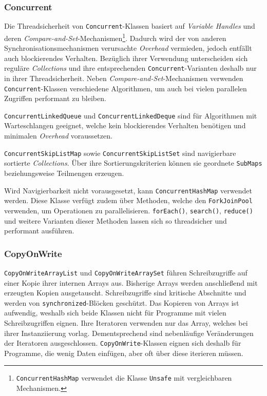 \documentclass[a4paper, 11pt]{article}
\begin{document}
\subsubsection{Concurrent}
\label{subsubsec:collections:concepts:concurrent}

Die Threadsicherheit von \verb|Concurrent|-Klassen basiert auf \textit{Variable Handles} und deren \textit{Compare-and-Set}-Mechanismen\footnote{\verb|ConcurrentHashMap| verwendet die Klasse \verb|Unsafe| mit vergleichbaren Mechanismen.}.
Dadurch wird der von anderen Synchronisationsmechanismen verursachte \textit{Overhead} vermieden, jedoch entfällt auch blockierendes Verhalten.
Bezüglich ihrer Verwendung unterscheiden sich reguläre \textit{Collections} und ihre entsprechenden \verb|Concurrent|-Varianten deshalb nur in ihrer Threadsicherheit.
Neben \textit{Compare-and-Set}-Mechanismen verwenden \verb|Concurrent|-Klassen verschiedene Algorithmen, um auch bei vielen parallelen Zugriffen performant zu bleiben.

\verb|ConcurrentLinkedQueue| und \verb|ConcurrentLinkedDeque| sind für Algorithmen mit Warteschlangen geeignet, welche kein blockierendes Verhalten benötigen und minimalen \textit{Overhead} voraussetzen.

\verb|ConcurrentSkipListMap| sowie \verb|ConcurrentSkipListSet| sind navigierbare sortierte \textit{Collections}.
Über ihre Sortierungskriterien können sie geordnete \verb|SubMaps| beziehungsweise Teilmengen erzeugen.

Wird Navigierbarkeit nicht vorausgesetzt, kann \verb|ConcurrentHashMap| verwendet werden.
Diese Klasse verfügt zudem über Methoden, welche den \verb|ForkJoinPool| verwenden, um Operationen zu parallelisieren.
\verb|forEach()|, \verb|search()|, \verb|reduce()| und weitere Varianten dieser Methoden lassen sich so threadsicher und performant ausführen.

\subsubsection{CopyOnWrite}
\label{subsubsec:collections:concepts:copyonwrite}

\verb|CopyOnWriteArrayList| und \verb|CopyOnWriteArraySet| führen Schreibzugriffe auf einer Kopie ihrer internen Arrays aus.
Bisherige Arrays werden anschließend mit erzeugten Kopien ausgetauscht.
Schreibzugriffe sind kritische Abschnitte und werden von \verb|synchronized|-Blöcken geschützt.
Das Kopieren von Arrays ist aufwendig, weshalb sich beide Klassen nicht für Programme mit vielen Schreibzugriffen eignen.
Ihre Iteratoren verwenden nur das Array, welches bei ihrer Instanziierung vorlag.
Dementsprechend sind nebenläufige Veränderungen der Iteratoren ausgeschlossen.
\verb|CopyOnWrite|-Klassen eignen sich deshalb für Programme, die wenig Daten einfügen, aber oft über diese iterieren müssen.
\end{document}
